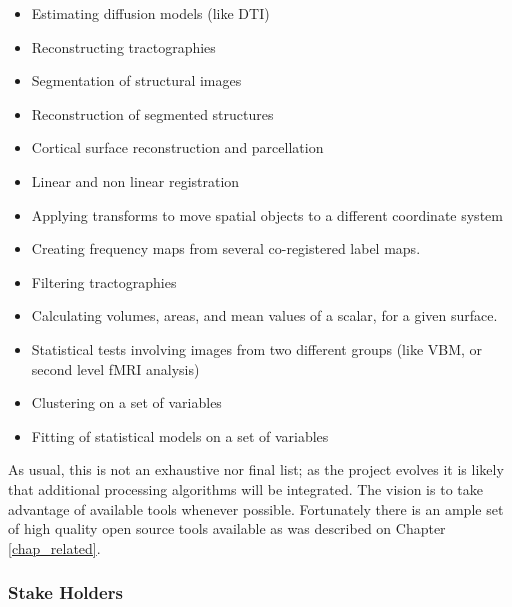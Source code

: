 \begin{itemize}
\item Estimating diffusion models (like DTI)
\item Reconstructing tractographies
\item Segmentation of structural images
\item Reconstruction of segmented structures
\item Cortical surface reconstruction and parcellation
\item Linear and non linear registration
\item Applying transforms to move spatial objects to a different coordinate system
\item Creating frequency maps from several co-registered label maps.
\item Filtering tractographies
\item Calculating volumes, areas, and mean values of a scalar, for a given surface.
\item Statistical tests involving images from two different groups (like VBM, or second level fMRI analysis)
\item Clustering on a set of variables
\item Fitting of statistical models on a set of variables
\end{itemize}

As usual, this is not an exhaustive nor final list; as the project evolves it is likely that additional processing algorithms will be integrated. The vision is to take advantage of available tools whenever possible. Fortunately there is an ample set of high quality open source tools available as was described on Chapter \ref{chap_related}.

\subsubsection{Stake Holders}

